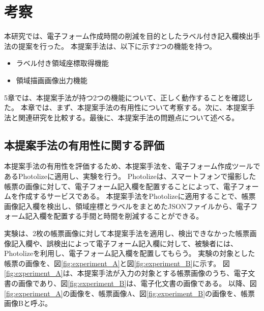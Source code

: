 \chapter{考察}\label{cha:Discussion}
本研究では、電子フォーム作成時間の削減を目的としたラベル付き記入欄検出手法の提案を行った。
本提案手法は、以下に示す2つの機能を持つ。

\begin{itemize}
  \item ラベル付き領域座標取得機能
  \item 領域描画画像出力機能
\end{itemize}

5章では、本提案手法が持つ2つの機能について、正しく動作することを確認した。
本章では、まず、本提案手法の有用性について考察する。次に、本提案手法と関連研究を比較する。最後に、本提案手法の問題点について述べる。

\section{本提案手法の有用性に関する評価}\label{sec:evalue_usefulness}
本提案手法の有用性を評価するため、本提案手法を、電子フォーム作成ツールであるPhotolizeに適用し、実験を行う。
Photolizeは、スマートフォンで撮影した帳票の画像に対して、電子フォーム記入欄を配置することによって、電子フォームを作成するサービスである\cite{Photolize}。
本提案手法をPhotolizeに適用することで、帳票画像記入欄を検出し、領域座標とラベルをまとめたJSONファイルから、電子フォーム記入欄を配置する手間と時間を削減することができる。

実験は、2枚の帳票画像に対して本提案手法を適用し、検出できなかった帳票画像記入欄や、誤検出によって電子フォーム記入欄に対して、被験者には、Photolizeを利用し、電子フォーム記入欄を配置してもらう。
実験の対象とした帳票の画像を、図\ref{fig:experiment_A}と図\ref{fig:experiment_B}に示す。
図\ref{fig:experiment_A}は、本提案手法が入力の対象とする帳票画像のうち、電子文書の画像であり、図\ref{fig:experiment_B}は、電子化文書の画像である。
以降、図\ref{fig:experiment_A}の画像を、帳票画像A、図\ref{fig:experiment_B}の画像を、帳票画像Bと呼ぶ。

